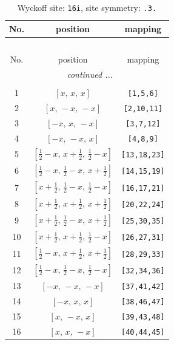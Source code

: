 \documentclass[fleqn,8pt]{jsarticle}
\begin{document}
\begin{longtable}{ccc}
\caption{Wyckoff site: {\tt 16i}, site symmetry: {\tt .3.}}
 \\
 \hline \hline
No. & position & mapping \\ \hline \endfirsthead

\multicolumn{2}{l}{\tablename\ \thetable{}} \\
 \hline \hline
No. & position & mapping \\ \hline \endhead

 \hline \hline
\multicolumn{2}{r}{\footnotesize\it continued ...} \\ \endfoot

 \hline \hline
\multicolumn{2}{r}{} \\ \endlastfoot

1 & $\left[ x,\, x,\, x \right]$ & {\tt [1,5,6]} \\ \hline
2 & $\left[ x,\, - x,\, - x \right]$ & {\tt [2,10,11]} \\ \hline
3 & $\left[ - x,\, x,\, - x \right]$ & {\tt [3,7,12]} \\ \hline
4 & $\left[ - x,\, - x,\, x \right]$ & {\tt [4,8,9]} \\ \hline
5 & $\left[ \frac{1}{2} - x,\, x + \frac{1}{2},\, \frac{1}{2} - x \right]$ & {\tt [13,18,23]} \\ \hline
6 & $\left[ \frac{1}{2} - x,\, \frac{1}{2} - x,\, x + \frac{1}{2} \right]$ & {\tt [14,15,19]} \\ \hline
7 & $\left[ x + \frac{1}{2},\, \frac{1}{2} - x,\, \frac{1}{2} - x \right]$ & {\tt [16,17,21]} \\ \hline
8 & $\left[ x + \frac{1}{2},\, x + \frac{1}{2},\, x + \frac{1}{2} \right]$ & {\tt [20,22,24]} \\ \hline
9 & $\left[ x + \frac{1}{2},\, \frac{1}{2} - x,\, x + \frac{1}{2} \right]$ & {\tt [25,30,35]} \\ \hline
10 & $\left[ x + \frac{1}{2},\, x + \frac{1}{2},\, \frac{1}{2} - x \right]$ & {\tt [26,27,31]} \\ \hline
11 & $\left[ \frac{1}{2} - x,\, x + \frac{1}{2},\, x + \frac{1}{2} \right]$ & {\tt [28,29,33]} \\ \hline
12 & $\left[ \frac{1}{2} - x,\, \frac{1}{2} - x,\, \frac{1}{2} - x \right]$ & {\tt [32,34,36]} \\ \hline
13 & $\left[ - x,\, - x,\, - x \right]$ & {\tt [37,41,42]} \\ \hline
14 & $\left[ - x,\, x,\, x \right]$ & {\tt [38,46,47]} \\ \hline
15 & $\left[ x,\, - x,\, x \right]$ & {\tt [39,43,48]} \\ \hline
16 & $\left[ x,\, x,\, - x \right]$ & {\tt [40,44,45]} \\
\end{longtable}
\end{document}
